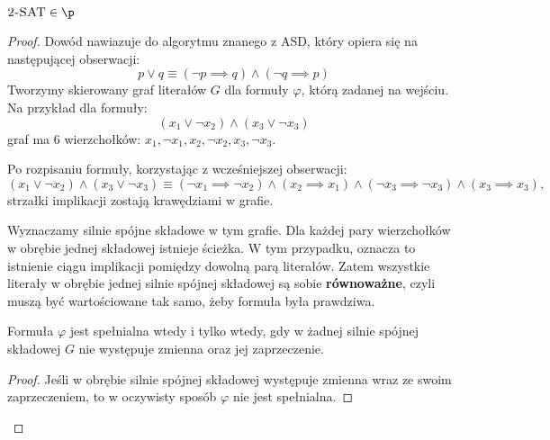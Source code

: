 \begin{theorem}
    \( \textsc{2-SAT} \in \p \)
\end{theorem}
\begin{proof}
    Dowód nawiazuje do algorytmu znanego z ASD, który opiera się na następującej obserwacji:
    \[ 
        p \lor q \equiv (\neg p \implies q) \land (\neg q \implies p)
    \]
    Tworzymy skierowany graf literałów \(G\) dla formuły \(\varphi\), którą zadanej na wejściu. Na przykład dla formuły:
    \[
        (x_1 \lor \neg x_2) \land (x_3 \lor \neg x_3)
    \]
    graf ma 6 wierzchołków: \(x_1, \neg x_1, x_2, \neg x_2, x_3, \neg x_3\).

    Po rozpisaniu formuły, korzystając z wcześniejszej obserwacji:
    \[
        (x_1 \lor \neg x_2) \land (x_3 \lor \neg x_3) \equiv (\neg x_1 \implies \neg x_2) \land (x_2 \implies x_1) \land (\neg x_3 \implies \neg x_3) \land (x_3 \implies x_3),
    \]
    strzałki implikacji zostają krawędziami w grafie.

    \begin{center}
    \end{center}

    Wyznaczamy silnie spójne składowe w tym grafie. Dla każdej pary wierzchołków w obrębie jednej składowej istnieje ścieżka. W tym przypadku, oznacza to istnienie ciągu implikacji pomiędzy dowolną parą literałów.
    Zatem wszystkie literały w obrębie jednej silnie spójnej składowej są sobie \textbf{równoważne}, czyli muszą być wartościowane tak samo, żeby formuła była prawdziwa.

    \begin{lemma}
        Formuła \(\varphi\) jest spełnialna wtedy i tylko wtedy, gdy w żadnej silnie spójnej składowej \(G\) nie występuje zmienna oraz jej zaprzeczenie. 
    \end{lemma}
    \begin{proof}
        Jeśli w obrębie silnie spójnej składowej występuje zmienna wraz ze swoim zaprzeczeniem, to w oczywisty sposób \(\varphi\) nie jest spełnialna. 


\end{proof}
\end{proof}
